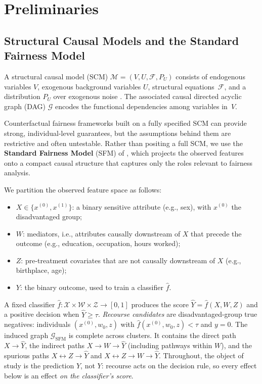 \section{Preliminaries}\label{sec:prelim}
\subsection{Structural Causal Models and the Standard Fairness Model}
\label{sec:sfm}

A structural causal model (SCM) $\mathcal{M} = (V, U, \mathcal{F}, P_U)$
consists of endogenous variables $V$, exogenous background variables $U$,
structural equations~$\mathcal{F}$, and a distribution $P_U$ over exogenous
noise \citep{pearl2000causality}.
The associated causal directed acyclic graph (DAG) $\mathcal{G}$ encodes the
functional dependencies among variables in~$V$.

\noindent
Counterfactual fairness frameworks built on a fully specified SCM can provide
strong, individual-level guarantees, but the assumptions behind them are
restrictive and often untestable. Rather than positing a full SCM, we use the
\textbf{Standard Fairness Model} (SFM) of \citet{plecko2022causalfairnessanalysis},
which projects the observed features onto a compact causal structure that
captures only the roles relevant to fairness analysis.

\begin{definition}
\label{def:sfm}
We partition the observed feature space as follows:
\begin{itemize}[nosep]
  \item $X\in\{x^{(0)},x^{(1)}\}$: a binary sensitive attribute (e.g., sex), with $x^{(0)}$ the disadvantaged group;
  \item $W$: mediators, i.e., attributes causally downstream of $X$ that precede the outcome (e.g., education, occupation, hours worked);
  \item $Z$: pre-treatment covariates that are not causally downstream of $X$ (e.g., birthplace, age);
  \item $Y$: the binary outcome, used to train a classifier $\hat{f}$.
\end{itemize}
\end{definition}

A fixed classifier $\hat f:\mathcal X\times\mathcal W\times\mathcal Z\to[0,1]$
produces the score $\hat Y=\hat f(X,W,Z)$ and a positive decision when
$\hat Y\ge\tau$. \emph{Recourse candidates} are disadvantaged-group true
negatives: individuals $(x^{(0)},w_0,z)$ with $\hat f(x^{(0)},w_0,z)<\tau$ and
$y=0$. The induced graph $\mathcal G_{\mathrm{SFM}}$ is complete across
clusters. It contains the direct path $X\to\hat Y$, the indirect paths
$X\to W\to\hat{Y}$ (including pathways within $W$), and the spurious paths
$X\leftrightarrow Z\to\hat{Y}$ and $X\leftrightarrow Z\to W\to \hat{Y}$.
Throughout, the object of study is the prediction $\hat Y$, not $Y$: recourse
acts on the decision rule, so every effect below is an effect \emph{on the
classifier's score}.

